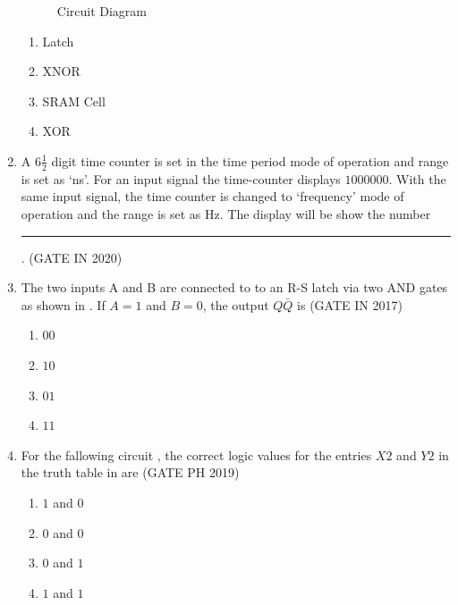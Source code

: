 \begin{enumerate}[label=\arabic*.,ref=\theenumi]
\begin{figure}[H]
\centering
\resizebox{0.5\columnwidth}{!}{%

	}
\caption{Circuit Diagram}
	   \label{fig:GATE-EC2019,15}
\end{figure}
\begin{enumerate}
\item Latch
\item XNOR
\item SRAM Cell
\item XOR
\end{enumerate}
\fi
\item A $6{\frac{1}{2}}$ digit time counter is set in the time period mode of operation and range is set as `ns'. For an input signal the time-counter displays $1000000$. With the same input signal, the time counter is changed to `frequency' mode of operation and the range is set as Hz. The display will be show the number \rule{1cm}{0.1pt}.
	\hfill (GATE IN 2020)
\item The two inputs A and B are connected to to an R-S latch via two AND gates as shown in  
       .
If $A=1$ and $B=0$, the output $Q\bar{Q}$ is
       \hfill (GATE IN 2017)
    \begin{enumerate}
   		\item $00$ 
   		\item $10$ 
   		\item $01$ 
   		\item $11$ 
   \end{enumerate}
    \begin{figure}[H]
        \centering
	\resizebox{0.5\columnwidth}{!}{%
        
	    }
	    \caption{}
       \label{fig:GATE IN2017,43}
       \end{figure}
\item For the fallowing circuit
,
 the correct logic values for the entries $X2$ and $Y2$ in the truth table 
in
 are
\hfill (GATE PH 2019)
   \begin{enumerate}
\item $1$ and $0$
\item $0$ and $0$
\item $0$ and $1$
\item $1$ and $1$
\end{enumerate}
%
\begin{figure}[H]
        \centering
	\resizebox{0.75\columnwidth}{!}{%
        
	}
	\caption{}
\label{fig:PH2019,36}
       \end{figure}
%
		\begin{table}[H]
			\centering
			\resizebox{0.5\columnwidth}{!}{%
			
			}
	\caption{}
\label{tab:PH2019,36}
		\end{table}
\end{enumerate}
